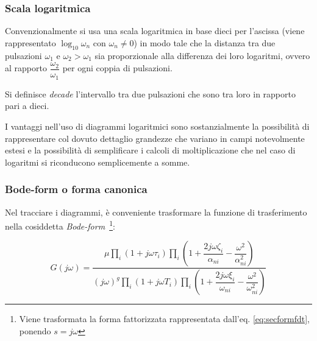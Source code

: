 \documentclass[a4paper]{report}
\begin{document}
\subsubsection{Scala logaritmica}
Convenzionalmente si usa una scala logaritmica in base dieci
per l'ascissa (viene rappresentato $\log_{10}\omega_n$ con $\omega_n
\neq 0$) in modo tale che la distanza tra due pulsazioni  $\omega_1$ e
$\omega_2 > \omega_1$ sia proporzionale alla differenza dei loro
logaritmi, ovvero al rapporto $\dfrac{\omega_2}{\omega_1}$ per ogni
coppia di pulsazioni.

Si definisce \emph{decade}  l'intervallo tra due
pulsazioni che sono tra loro in rapporto pari a dieci.

I vantaggi nell'uso di diagrammi logaritmici sono sostanzialmente la
possibilit\`a di rappresentare col dovuto dettaglio grandezze che
variano in campi notevolmente estesi e la possibilit\`a di semplificare
i calcoli di moltiplicazione che nel caso di logaritmi si riconducono
semplicemente a somme.

\subsubsection{Bode-form o forma canonica}
Nel tracciare i diagrammi, \`e conveniente trasformare la
funzione di trasferimento nella cosiddetta
\emph{Bode-form}~\footnote{Viene trasformata la forma fattorizzata
  rappresentata dall'eq. \ref{eq:secformfdt}, ponendo $s=j\omega$}:

\begin{equation}\label{eq:bodeform}
  G(j\omega) = \dfrac{\mu \prod_i \left( 1 + j\omega \tau_i \right)
    \prod_i \left( 1 +\dfrac{2 j\omega \zeta_i}{\alpha_{ni}} -
    \dfrac{\omega^2}{\alpha^{2}_{ni}}\right)} {(j\omega)^g \prod_i( 1 +
    j\omega T_i ) \prod_i\left( 1 + \dfrac{2 j\omega \xi_i }{\omega_{ni}} -
    \dfrac{\omega^2}{\omega^{2}_{ni}}\right)}
\end{equation}
\end{document}
